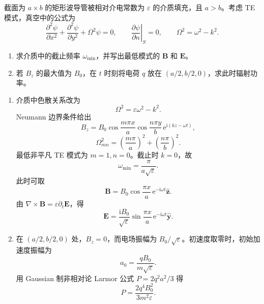 \begin{question}[填充介质的矩形波导]
截面为 $a\times b$ 的矩形波导管被相对介电常数为 $\varepsilon$ 的介质填充，且 $a>b$。考虑 TE 模式，真空中的公式为
\[
  \frac{\partial^2\psi}{\partial x^2}+\frac{\partial^2\psi}{\partial y^2}+\Omega^2\psi=0,
  \qquad
  \left.\frac{\partial\psi}{\partial n}\right|_S=0,
  \qquad
  \Omega^2=\omega^2-k^2 .
\]
\begin{enumerate}
  \item 求介质中的截止频率 $\omega_{\min}$，并写出最低模式的 $\mathbf B$ 和 $\mathbf E$。
  \item 若 $B_z$ 的最大值为 $B_0$，在 $t$ 时刻将电荷 $q$ 放在 $(a/2,b/2,0)$，求此时辐射功率。
\end{enumerate}
\begin{solution}
\begin{enumerate}
  \item 介质中色散关系改为
  \[
    \Omega^2=\varepsilon\omega^2-k^2 .
  \]
  Neumann 边界条件给出
  \[
    B_z=B_0\cos\frac{m\pi x}{a}\cos\frac{n\pi y}{b}\,
    \mathrm e^{\mathrm i(kz-\omega t)},
  \]
  \[
    \Omega_{mn}^2=\left(\frac{m\pi}{a}\right)^2+
    \left(\frac{n\pi}{b}\right)^2 .
  \]
  最低非平凡 TE 模式为 $m=1,n=0$。截止时 $k=0$，故
  \[
    \boxed{\omega_{\min}=\frac{\pi}{a\sqrt\varepsilon}} .
  \]
  此时可取
  \[
    \mathbf B=B_0\cos\frac{\pi x}{a}\,\mathrm e^{-\mathrm i\omega t}\hat{\mathbf z} .
  \]
  由 $\nabla\times\mathbf B=\varepsilon\partial_t\mathbf E$，得
  \[
    \mathbf E=\frac{\mathrm iB_0}{\sqrt\varepsilon}
    \sin\frac{\pi x}{a}\,\mathrm e^{-\mathrm i\omega t}\hat{\mathbf y} .
  \]

  \item 在 $(a/2,b/2,0)$ 处，$B_z=0$，而电场振幅为 $B_0/\sqrt\varepsilon$。初速度取零时，初始加速度振幅为
  \[
    a_0=\frac{qB_0}{m\sqrt\varepsilon} .
  \]
  用 Gaussian 制非相对论 Larmor 公式 $P=2q^2a^2/3$ 得
  \[
    \boxed{P=\frac{2q^4B_0^2}{3m^2\varepsilon}} .
  \]
\end{enumerate}
\end{solution}
\end{question}

